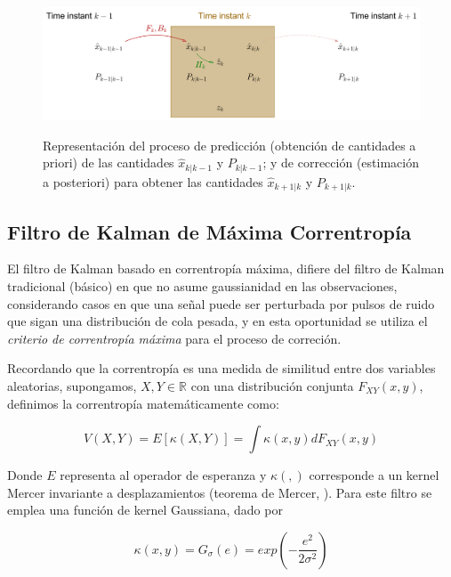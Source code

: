\begin{figure}[h!]
\centering
\includegraphics[scale=0.5]{images/kfb}
\label{fig:kfb}
\caption{Representaci\'on del proceso de predicci\'on (obtenci\'on de cantidades a priori) de las cantidades $\hat{x}_{k|k-1}$ y $P_{k|k-1}$;  y de correcci\'on (estimaci\'on a posteriori) para obtener las cantidades $\hat{x}_{k+1|k}$ y $P_{k+1|k}$.}
\end{figure}

\subsection{Filtro de Kalman de M\'axima Correntrop\'ia}

El filtro de Kalman basado en correntrop\'ia m\'axima\cite{badong}, difiere del filtro de Kalman tradicional (b\'asico) en que no asume gaussianidad en las observaciones, considerando casos en que una se\~nal puede ser perturbada por pulsos de ruido que sigan una distribuci\'on de cola pesada, y en esta oportunidad se utiliza el \textit{criterio de correntrop\'ia m\'axima} para el proceso de correci\'on. 
\bigskip

Recordando que la correntrop\'ia es una medida de similitud entre dos variables aleatorias, supongamos, $X,Y \in \mathbb{R}$ con una distribuci\'on conjunta $F_{XY} (x,y)$, definimos la correntrop\'ia matem\'aticamente como:

\begin{equation}
V(X,Y) = E[\kappa(X,Y)] = \int \kappa(x,y) dF_{XY} (x,y)
\label{eq:eqcorr}
\end{equation}

Donde $E$ representa al operador de esperanza y $\kappa(,)$ corresponde a un kernel Mercer invariante a desplazamientos (teorema de Mercer, \cite{mercer}). Para este filtro se emplea una funci\'on de kernel Gaussiana, dado por

\begin{equation}
\kappa(x, y) = G_{\sigma} (e) = exp \left(-\dfrac{e^2}{2\sigma^2} \right)
\label{eq:eqkappa}
\end{equation}


